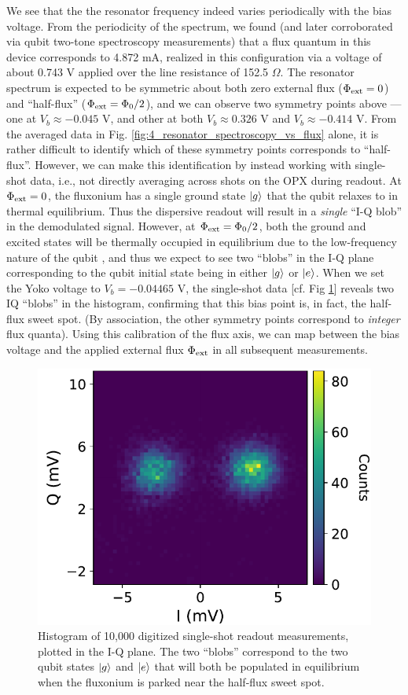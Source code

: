 We see that the the resonator frequency indeed varies periodically with the bias voltage. From the periodicity of the spectrum, we found (and later corroborated via qubit two-tone spectroscopy measurements) that a flux quantum in this device corresponds to 4.872 mA, realized in this configuration via a voltage of about 0.743 V applied over the line resistance of 152.5 $\Omega$. The resonator spectrum is expected to be symmetric about both zero external flux ($\Phi_{\rm ext} = 0$) and ``half-flux'' ($\Phi_{\rm ext} = \Phi_0/2$), and we can observe two symmetry points above --- one at $V_b \approx -0.045$ V, and other at both $V_b \approx 0.326$ V and $V_b \approx -0.414$ V. From the averaged data in Fig. \ref{fig:4_resonator_spectroscopy_vs_flux} alone, it is rather difficult to identify which of these symmetry points corresponds to ``half-flux''. However, we can make this identification by instead working with single-shot data, i.e., not directly averaging across shots on the OPX during readout. At $\Phi_{\rm ext} = 0$, the fluxonium has a single ground state $\lvert g\rangle$ that the qubit relaxes to in thermal equilibrium. Thus the dispersive readout will result in a \textit{single} ``I-Q blob'' in the demodulated signal. However, at $\Phi_{\rm ext} = \Phi_0/2$, both the ground and excited states will be thermally occupied in equilibrium due to the low-frequency nature of the qubit \cite{manenti2023quantum}, and thus we expect to see two ``blobs'' in the I-Q plane corresponding to the qubit initial state being in either $\lvert g\rangle$ or $\lvert e\rangle$. When we set the Yoko voltage to $V_b = -0.04465$ V, the single-shot data [cf. Fig \ref{fig:4_single_shots}] reveals two IQ ``blobs'' in the histogram, confirming that this bias point is, in fact, the half-flux sweet spot. (By association, the other symmetry points correspond to \textit{integer} flux quanta). Using this calibration of the flux axis, we can map between the bias voltage and the applied external flux $\Phi_{\rm ext}$ in all subsequent measurements. 

\begin{figure}[h]
    \centering
    \includegraphics[width=0.51\linewidth]{Figures/4/single_shots.pdf}
    \caption[Readout I-Q histogram showing two characteristic readout ``blobs'' when the fluxonium is parked at half-flux.]{Histogram of 10,000 digitized single-shot readout measurements, plotted in the I-Q plane. The two ``blobs'' correspond to the two qubit states $\lvert g\rangle$ and $\lvert e\rangle$ that will both be populated in equilibrium when the fluxonium is parked near the half-flux sweet spot.}
\label{fig:4_single_shots}
\end{figure}



